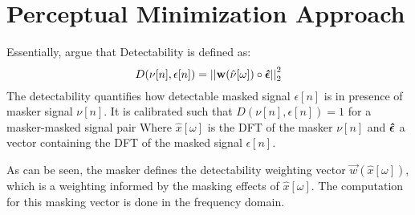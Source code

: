 \section{Perceptual Minimization Approach}
Essentially, argue that Detectability is defined as: 
\begin{equation}
    D(\nu[n],\epsilon[n]) = \norm[2][2]{\vec{w}(\hat{\nu}[\omega]) \circ \vecsymbol{\hat{\epsilon}}}     
\end{equation}
The detectability quantifies how detectable masked signal $\epsilon[n]$ is in presence of masker signal $\nu[n]$.  
It is calibrated such that $D(\nu[n],\epsilon[n]) = 1$ for a masker-masked signal pair
Where $\hat{x}[\omega]$ is the DFT of the masker $\nu[n]$ and $\boldsymbol{\hat{\epsilon}}$ a vector containing the DFT of the masked signal $\epsilon[n]$.

As can be seen, the masker defines the detectability weighting vector $\vec{w}(\hat{x}[\omega])$, which is a weighting informed by the masking effects of $\hat{x}[\omega]$.
The computation for this masking vector is done in the frequency domain.

